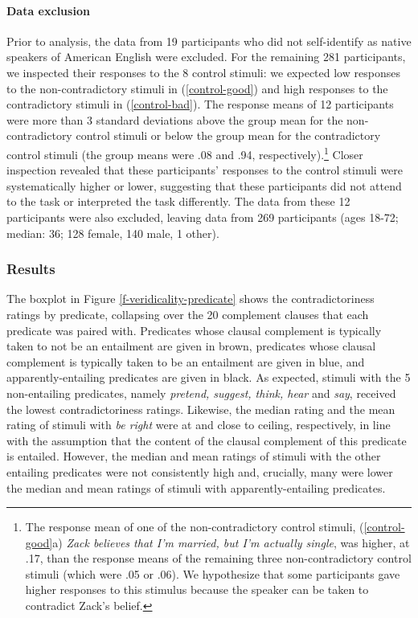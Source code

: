 \documentclass[11pt,fleqn]{article}
\newcommand{\6}{\mbox{$[\hspace*{-.6mm}[$}}
\newcommand{\9}{\mbox{$]\hspace*{-.6mm}]$}}
\begin{document}
\paragraph{Data exclusion}
Prior to analysis, the data from 19 participants who did not self-identify as native speakers of American English were excluded. For the remaining 281 participants, we inspected their responses to the 8 control stimuli: we expected low responses to the non-contradictory stimuli in (\ref{control-good}) and high responses to the contradictory stimuli in (\ref{control-bad}). The response means of 12 participants were more than 3 standard deviations above the group mean for the non-contradictory control stimuli or below the group mean for the contradictory control stimuli (the group means were .08 and .94, respectively).\footnote{The response mean of one of the non-contradictory control stimuli, (\ref{control-good}a) {\em Zack believes that I'm married, but I'm actually single}, was higher, at .17, than the response means of the remaining three non-contradictory control stimuli (which were .05 or .06). We hypothesize that some participants gave higher responses to this stimulus because the speaker can be taken to contradict Zack's belief.} Closer inspection revealed that these participants' responses to the control stimuli were systematically higher or lower, suggesting that these participants did not attend to the task or interpreted the task differently. The data from these 12 participants were also excluded, leaving data from 269 participants (ages 18-72; median: 36; 128 female, 140 male, 1 other).  

\subsubsection{Results}

The boxplot in Figure \ref{f-veridicality-predicate} shows the contradictoriness ratings by predicate, collapsing over the 20 complement clauses that each predicate was paired with. Predicates whose clausal complement is typically taken to not be an entailment are given in brown, predicates whose clausal complement is typically taken to be an entailment are given in blue, and apparently-entailing predicates are given in black. As expected, stimuli with the 5 non-entailing predicates, namely {\em pretend, suggest, think, hear} and {\em say}, received the lowest contradictoriness ratings. Likewise, the median rating and the mean rating of stimuli with {\em be right} were at and close to ceiling, respectively, in line with the assumption that the content of the clausal complement of this predicate is entailed. However, the median and mean ratings of stimuli with the other entailing predicates were not consistently high and, crucially, many were lower the median and mean ratings of stimuli with apparently-entailing predicates. 
\end{document}
